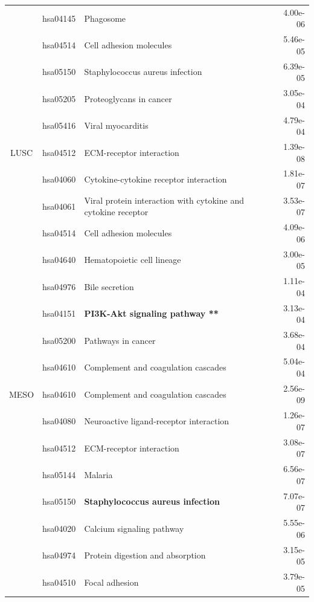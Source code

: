 \begin{longtable}{cllr}
 & hsa04145 & \textcolor{\clrnew}{Phagosome} & 4.00e-06 \\ 
 & hsa04514 & \textcolor{\clrnew}{Cell adhesion molecules} & 5.46e-05 \\ 
 & hsa05150 & \textcolor{\clrnew}{Staphylococcus aureus infection} & 6.39e-05 \\ 
 & hsa05205 & \textcolor{\clrnew}{Proteoglycans in cancer} & 3.05e-04 \\ 
 & hsa05416 & \textcolor{\clrnew}{Viral myocarditis} & 4.79e-04 \\ 
\midrule 
LUSC & hsa04512 & \textcolor{\clrnew}{ECM-receptor interaction} & 1.39e-08\\ 
 & hsa04060 & \textcolor{\clrnew}{Cytokine-cytokine receptor interaction} & 1.81e-07 \\ 
 & hsa04061 & \textcolor{\clrnew}{Viral protein interaction with cytokine and cytokine receptor} & 3.53e-07 \\ 
 & hsa04514 & \textcolor{\clrnew}{Cell adhesion molecules} & 4.09e-06 \\ 
 & hsa04640 & \textcolor{\clrnew}{Hematopoietic cell lineage} & 3.00e-05 \\ 
 & hsa04976 & \textcolor{\clrnew}{Bile secretion} & 1.11e-04 \\ 
 \rowcolor{\clrpath}& hsa04151 & \textbf{PI3K-Akt signaling pathway **} & 3.13e-04 \\ 
 & hsa05200 & \textcolor{\clrnew}{Pathways in cancer} & 3.68e-04 \\ 
 & hsa04610 & \textcolor{\clrnew}{Complement and coagulation cascades} & 5.04e-04 \\ 
\midrule 
\rowcolor{\clrmatch}MESO & hsa04610 & Complement and coagulation cascades & 2.56e-09\\ 
 & hsa04080 & \textcolor{\clrnew}{Neuroactive ligand-receptor interaction} & 1.26e-07 \\ 
 \rowcolor{\clrmatch}& hsa04512 & ECM-receptor interaction & 3.08e-07 \\ 
 & hsa05144 & \textcolor{\clrnew}{Malaria} & 6.56e-07 \\ 
 \rowcolor{\clrpath}& hsa05150 & \textbf{Staphylococcus aureus infection} & 7.07e-07 \\ 
 & hsa04020 & \textcolor{\clrnew}{Calcium signaling pathway} & 5.55e-06 \\ 
 \rowcolor{\clrmatch}& hsa04974 & Protein digestion and absorption & 3.15e-05 \\ 
 \rowcolor{\clrmatch}& hsa04510 & Focal adhesion & 3.79e-05 \\ 

\end{longtable}

